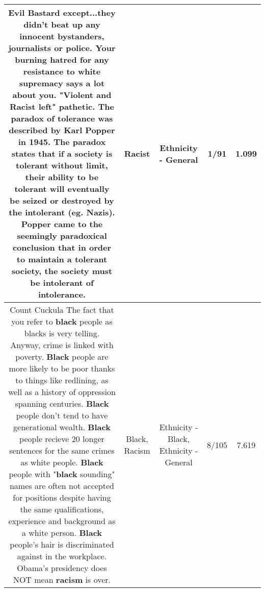 \documentclass[11pt]{article}
\newlength\mylength
\begin{document}
\begin{center}
\begin{longtable}{|C{.65\mylength}|C{.30\mylength}|C{.12\mylength}|C{.12\mylength}|C{.12\mylength}|}
  \small Evil Bastard except...they didn't beat up any innocent bystanders, journalists or police. Your burning hatred for any resistance to white supremacy says a lot about you. "Violent and \textbf{Racist} left" pathetic. The paradox of tolerance was described by Karl Popper in 1945. The paradox states that if a society is tolerant without limit, their ability to be tolerant will eventually be seized or destroyed by the intolerant (eg. Nazis). Popper came to the seemingly paradoxical conclusion that in order to maintain a tolerant society, the society must be intolerant of intolerance.\normalsize   & Racist & Ethnicity - General & 1/91 & 1.099 \\  \hline
  \small Count Cuckula The fact that you refer to \textbf{black} people as blacks is very telling. Anyway, crime is linked with poverty. \textbf{Black} people are more likely to be poor thanks to things like redlining, as well as a history of oppression spanning centuries. \textbf{Black} people don't tend to have generational wealth. \textbf{Black} people recieve 20 longer sentences for the same crimes as white people. \textbf{Black} people with "\textbf{black} sounding" names are often not accepted for positions despite having the same qualifications, experience and background as a white person. \textbf{Black} people's hair is discriminated against in the workplace. Obama's presidency does NOT mean \textbf{racism} is over.\normalsize   & Black, Racism & Ethnicity - Black, Ethnicity - General & 8/105 & 7.619 \\  \hline

\end{longtable}
\end{center}
\end{document}
